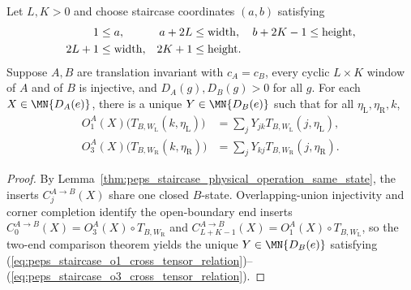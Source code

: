 \begin{lemma}%
    \label{thm:peps_cross_tensor_virtual_operation_of_staircase}
    \leanok
    Let $L,K>0$ and choose staircase coordinates $(a,b)$ satisfying
    \begin{align}
        1    & \leq a,
             & a+2L                 & \leq \mathrm{width},
             & b+2K-1               & \leq \mathrm{height},
        \notag                                              \\
        2L+1 & \leq \mathrm{width},
             & 2K+1                 & \leq \mathrm{height}.
        \notag
    \end{align}
    Suppose $A,B$ are translation invariant with $c_A=c_B$, every cyclic
    $L\times K$ window of $A$ and of $B$ is injective, and $D_A(g),D_B(g)>0$
    for all $g$. For each $X\in\MN{D_A(e)}$, there is a unique
    $Y\in\MN{D_B(e)}$ such that for all $\eta_{\mathrm L},\eta_{\mathrm R},k$,
    \begin{align}
        O_1^A(X)\bigl(T_{B,W_{\mathrm L}}(k,\eta_{\mathrm L})\bigr)
         & =\sum_jY_{jk}T_{B,W_{\mathrm L}}(j,\eta_{\mathrm L}),
        \label{eq:peps_staircase_o1_cross_tensor_relation}       \\
        O_3^A(X)\bigl(T_{B,W_{\mathrm R}}(k,\eta_{\mathrm R})\bigr)
         & =\sum_jY_{kj}T_{B,W_{\mathrm R}}(j,\eta_{\mathrm R}).
        \label{eq:peps_staircase_o3_cross_tensor_relation}
    \end{align}
\end{lemma}
\begin{proof}
    \leanok
    By Lemma~\ref{thm:peps_staircase_physical_operation_same_state}, the
    inserts $C_j^{A\to B}(X)$ share one closed $B$-state. Overlapping-union
    injectivity and corner completion identify the open-boundary end inserts
    $C_0^{A\to B}(X)=O_3^A(X)\circ T_{B,W_{\mathrm R}}$ and
    $C_{L+K-1}^{A\to B}(X)=O_1^A(X)\circ T_{B,W_{\mathrm L}}$, so the two-end
    comparison theorem yields the unique $Y\in\MN{D_B(e)}$ satisfying
    (\ref{eq:peps_staircase_o1_cross_tensor_relation})--(\ref{eq:peps_staircase_o3_cross_tensor_relation}).
\end{proof}

